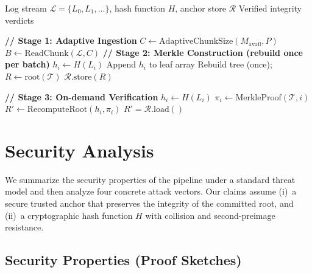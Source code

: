 \documentclass[preprint,12pt]{elsarticle}
\begin{document}
\begin{algorithm}[t]
\caption{Adaptive Merkle-Tree Ingestion and Verification}
\label{alg:pipeline}
\begin{algorithmic}[1]
\Require Log stream $\mathcal{L} = \{L_0, L_1, \ldots\}$, hash function $H$, anchor store $\mathcal{R}$
\Ensure Verified integrity verdicts

\Statex \textcolor{cPrimary}{\textbf{// Stage 1: Adaptive Ingestion}}
  \State $C \gets \mathrm{AdaptiveChunkSize}(M_{\text{avail}}, P)$ 
  \State $B \gets \mathrm{ReadChunk}(\mathcal{L}, C)$
\Statex \textcolor{cPrimary}{\textbf{// Stage 2: Merkle Construction (rebuild once per batch)}}
    \State $h_i \gets H(L_i)$
    \State Append $h_i$ to leaf array
  \EndFor
  \State Rebuild tree (once); $R \gets \mathrm{root}(\mathcal{T})$
  \State $\mathcal{R}.\mathrm{store}(R)$ 
\EndWhile

\Statex
\Statex \textcolor{cPrimary}{\textbf{// Stage 3: On-demand Verification}}
  \State $h_i \gets H(L_i)$
  \State $\pi_i \gets \mathrm{MerkleProof}(\mathcal{T}, i)$ 
  \State $R' \gets \mathrm{RecomputeRoot}(h_i, \pi_i)$
  \State \Return $R' = \mathcal{R}.\mathrm{load}()$
\EndFunction
\end{algorithmic}
\end{algorithm}


\section{Security Analysis}
\label{sec:security}

We summarize the security properties of the pipeline under a standard threat model and then analyze four concrete attack vectors.
Our claims assume (i)~a secure trusted anchor that preserves the integrity of the committed root, and (ii)~a cryptographic hash function $H$ with collision and second-preimage resistance.

\subsection{Security Properties (Proof Sketches)}
\end{document}
